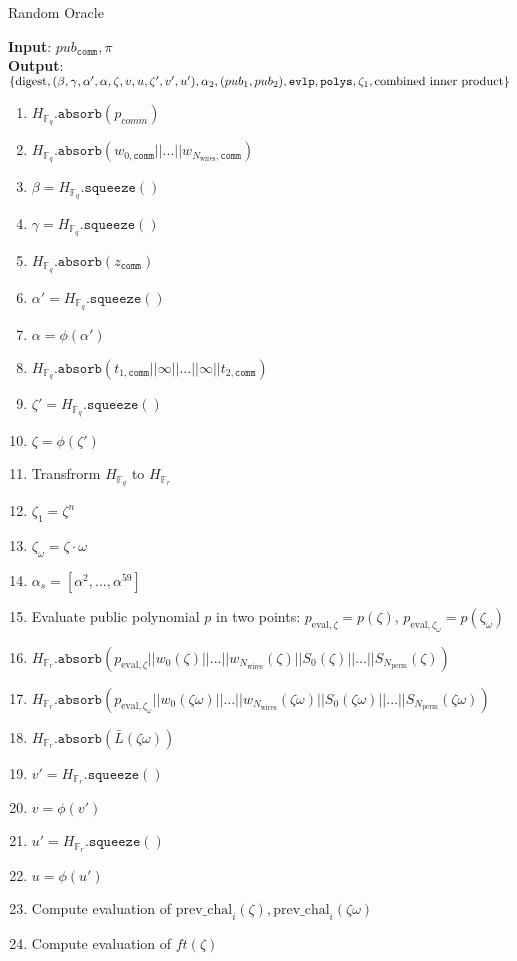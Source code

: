 \begin{algorithm}[H]
\caption{Random Oracle}
\textbf{Input}: $pub_{\texttt{comm}}, \pi$ \\
\textbf{Output}: $\{\text{digest}, (\beta, \gamma, \alpha', \alpha, \zeta, v, u, \zeta', v', u'), \\
			\alpha_2, (pub_1, pub_2), \texttt{evlp}, \texttt{polys}, \zeta_1, \text{combined inner product} \}$
\begin{enumerate}
	\item $H_{\mathbb{F}_q}.\texttt{absorb}(p_{comm})$
	\item $H_{\mathbb{F}_q}.\texttt{absorb}(w_{0, \texttt{comm}} || ... || w_{N_{\text{wires}}, \texttt{comm}})$
	\item $\beta = H_{\mathbb{F}_q}.\texttt{squeeze}()$
	\item $\gamma = H_{\mathbb{F}_q}.\texttt{squeeze}()$
	\item $H_{\mathbb{F}_q}.\texttt{absorb}(z_{\texttt{comm}})$
	\item $\alpha' = H_{\mathbb{F}_q}.\texttt{squeeze}()$
	\item $\alpha = \phi(\alpha')$
	\item $H_{\mathbb{F}_q}.\texttt{absorb}(t_{1, \texttt{comm}} || \infty || ... || \infty || t_{2, \texttt{comm}})$
	\item $\zeta' = H_{\mathbb{F}_q}.\texttt{squeeze}()$
	\item $\zeta = \phi(\zeta')$
	\item Transfrorm $H_{\mathbb{F}_q}$ to $H_{\mathbb{F}_r}$
	\item $\zeta_1 = \zeta^n$
	\item $\zeta_{\omega} = \zeta \cdot \omega$
	\item $\alpha_s = [\alpha^2, ..., \alpha^59]$
	\item Evaluate public polynomial $p$ in two points: $p_{\text{eval}, \zeta} = p(\zeta)$, $p_{\text{eval}, \zeta_\omega} = p(\zeta_\omega)$
	\item $H_{\mathbb{F}_r}.\texttt{absorb}(p_{\text{eval}, \zeta} || w_{0}(\zeta) || ... || w_{N_{\text{wires}}}(\zeta) 
		|| S_0(\zeta) || ... || S_{N_{\text{perm}}}(\zeta))$
	\item $H_{\mathbb{F}_r}.\texttt{absorb}(p_{\text{eval}, \zeta_\omega} || w_{0}(\zeta\omega) || ... || w_{N_{\text{wires}}}(\zeta\omega) 
		|| S_0(\zeta\omega) || ... || S_{N_{\text{perm}}}(\zeta\omega))$
	\item $H_{\mathbb{F}_r}.\texttt{absorb}(\bar{L}(\zeta\omega))$
	\item $v' = H_{\mathbb{F}_r}.\texttt{squeeze}()$
	\item $v = \phi(v')$
	\item $u' = H_{\mathbb{F}_r}.\texttt{squeeze}()$
	\item $u = \phi(u')$
	\item Compute evaluation of $\text{prev\_chal}_i(\zeta), \text{prev\_chal}_i(\zeta\omega)$
	\item Compute evaluation of $ft(\zeta)$
\end{enumerate}
\end{algorithm}

